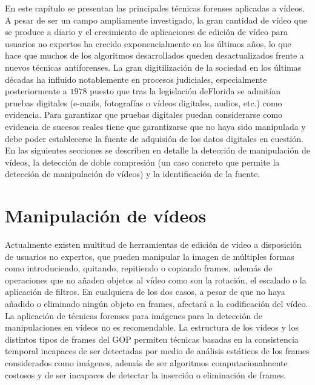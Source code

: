 En este capítulo se presentan las principales técnicas forenses aplicadas a vídeos. A pesar de ser un campo ampliamente investigado, la gran cantidad de vídeo que se produce a diario y el crecimiento de aplicaciones de edición de vídeo para usuarios no expertos ha crecido exponencialmente en los últimos a\~nos, lo que hace que muchos de los algoritmos desarrollados queden desactualizados frente a nuevos técnicas antiforenses. 
La gran digitilización de la sociedad en los últimas décadas ha influido notablemente en procesos judiciales, especialmente posteriormente a $1978$ puesto que tras la legislación deFlorida se admitían pruebas digitales (e-mails, fotografías o vídeos digitales, audios, etc.) como evidencia. Para garantizar que pruebas digitales puedan considerarse como evidencia de sucesos reales tiene que garantizarse que no haya sido manipulada y debe poder establecerse la fuente de adquisión de los datos digitales en cuestión. \\

En las siguientes secciones se describen en detalle la detección de manipulación de vídeos, la detección de doble compresión (un caso concreto que permite la detección de manipulación de vídeos) y la identificación de la fuente.

\section{Manipulación de vídeos}
Actualmente existen multitud de herramientas de edición de vídeo a disposición de usuarios no expertos, que pueden manipular la imagen de múltiples formas como introduciendo, quitando, repitiendo o copiando frames, además de operaciones que no a\~naden objetos al vídeo como son la rotación, el escalado o la aplicación de filtros. En cualquiera de los dos casos, a pesar de que no haya a\~nadido o eliminado ningún objeto en frames, afectará a la codificación del vídeo. \\

La aplicación de técnicas forenses para imágenes para la detección de manipulaciones en vídeos no es recomendable. La estructura de los vídeos y los distintos tipos de frames del GOP permiten técnicas basadas en la consistencia temporal incapaces de ser detectadas por medio de análisis estáticos de los frames considerados como imágenes, además de ser algoritmos computacionalmente costosos y de ser incapaces de detectar la inserción o eliminación de frames\cite{bestagini:2012}. \\

